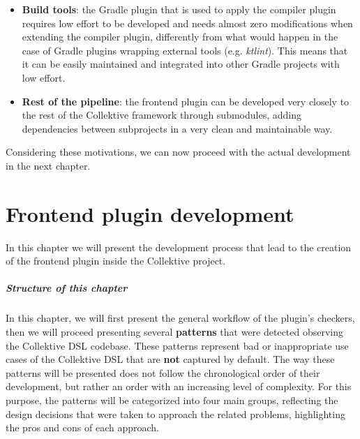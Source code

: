 \documentclass[12pt,a4paper,openright,twoside]{book}
\begin{document}
\begin{enumerate}
\begin{itemize}
    \item \textbf{Build tools}: the Gradle plugin that is used to apply the
    compiler plugin requires low effort to be developed and needs almost zero
    modifications when extending the compiler plugin, differently from what
    would happen in the case of Gradle plugins wrapping external tools (e.g.
    \emph{ktlint}). This means that it can be easily maintained and integrated
    into other Gradle projects with low effort.

    \item \textbf{Rest of the pipeline}: the frontend plugin can be developed 
    very closely to the rest of the Collektive framework through submodules,
    adding dependencies between subprojects in a very clean and maintainable
    way.
  \end{itemize}
\end{enumerate}

Considering these motivations, we can now proceed with the actual development in
the next chapter.

\chapter{Frontend plugin development}
\label{chap:contribution}

In this chapter we will present the development process that lead to the creation of 
the frontend plugin inside the Collektive project.

\paragraph{Structure of this chapter}

In this chapter, we will first present the general workflow of the plugin's
checkers, then we will proceed presenting several \textbf{patterns} that were
detected observing the Collektive DSL codebase. These patterns represent bad or
inappropriate use cases of the Collektive DSL that are \textbf{not} captured by 
default. 
%
The way these patterns will be presented does not follow the chronological order 
of their development, but rather an order with an increasing level of complexity.
For this purpose, the patterns will be categorized into four main groups, 
reflecting the design decisions that were taken to approach the related problems,
highlighting the pros and cons of each approach. 
\end{document}
